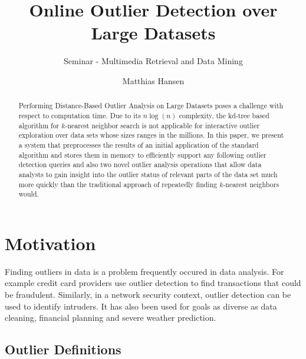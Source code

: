 \documentclass[runningheads]{llncs}
\begin{document}
%
%
%
%
%
\title{Online Outlier Detection over Large Datasets}
\subtitle{Seminar - Multimedia Retrieval and Data Mining}
%
\author{Matthias Hansen}
%
%

\maketitle              %

\begin{abstract}
Performing Distance-Based Outlier Analysis on Large Datasets poses a challenge with respect to computation time. Due to its $n\log(n)$ complexity, the kd-tree based algorithm for $k$-nearest neighbor search is not applicable for interactive outlier exploration over data sets whose sizes ranges in the millions. In this paper, we present a system that preprocesses the results of an initial application of the standard algorithm and stores them in memory to efficiently support any following outlier detection queries and also two novel outlier analysis operations that allow data analysts to gain insight into the outlier status of relevant parts of the data set much more quickly than the traditional approach of repeatedly finding $k$-nearest neighbors would.
\end{abstract}

\section{Motivation}
Finding outliers in data is a problem frequently occured in data analysis. For example credit card providers use outlier detection to find transactions that could be fraudulent. Similarly, in a network security context, outlier detection can be used to identify intruders. It has also been used for goals as diverse as data cleaning, financial planning and severe weather prediction.

\subsection{Outlier Definitions}
\end{document}
